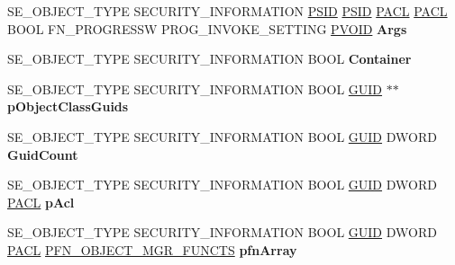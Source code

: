 \begin{DoxyCompactItemize}
\item 
\mbox{\label{struct___n_t_m_a_r_t_a_a40814131d37b427e01cbd51884eb06a3}} 
S\+E\+\_\+\+O\+B\+J\+E\+C\+T\+\_\+\+T\+Y\+PE S\+E\+C\+U\+R\+I\+T\+Y\+\_\+\+I\+N\+F\+O\+R\+M\+A\+T\+I\+ON \hyperlink{struct___s_i_d}{P\+S\+ID} \hyperlink{struct___s_i_d}{P\+S\+ID} \hyperlink{struct___a_c_l}{P\+A\+CL} \hyperlink{struct___a_c_l}{P\+A\+CL} B\+O\+OL F\+N\+\_\+\+P\+R\+O\+G\+R\+E\+S\+SW P\+R\+O\+G\+\_\+\+I\+N\+V\+O\+K\+E\+\_\+\+S\+E\+T\+T\+I\+NG \hyperlink{interfacevoid}{P\+V\+O\+ID} {\bfseries Args}
\item 
\mbox{\label{struct___n_t_m_a_r_t_a_a048477367aba165776025b11d89dbc1b}} 
S\+E\+\_\+\+O\+B\+J\+E\+C\+T\+\_\+\+T\+Y\+PE S\+E\+C\+U\+R\+I\+T\+Y\+\_\+\+I\+N\+F\+O\+R\+M\+A\+T\+I\+ON B\+O\+OL {\bfseries Container}
\item 
\mbox{\label{struct___n_t_m_a_r_t_a_a9179c2e71dad07ca0768cccbfb7040cc}} 
S\+E\+\_\+\+O\+B\+J\+E\+C\+T\+\_\+\+T\+Y\+PE S\+E\+C\+U\+R\+I\+T\+Y\+\_\+\+I\+N\+F\+O\+R\+M\+A\+T\+I\+ON B\+O\+OL \hyperlink{interface_g_u_i_d}{G\+U\+ID} $\ast$$\ast$ {\bfseries p\+Object\+Class\+Guids}
\item 
\mbox{\label{struct___n_t_m_a_r_t_a_a1e26ec4b26f1d5382884581e386419ce}} 
S\+E\+\_\+\+O\+B\+J\+E\+C\+T\+\_\+\+T\+Y\+PE S\+E\+C\+U\+R\+I\+T\+Y\+\_\+\+I\+N\+F\+O\+R\+M\+A\+T\+I\+ON B\+O\+OL \hyperlink{interface_g_u_i_d}{G\+U\+ID} D\+W\+O\+RD {\bfseries Guid\+Count}
\item 
\mbox{\label{struct___n_t_m_a_r_t_a_a8ed5f4402cc4c53641fa3c55f691ef28}} 
S\+E\+\_\+\+O\+B\+J\+E\+C\+T\+\_\+\+T\+Y\+PE S\+E\+C\+U\+R\+I\+T\+Y\+\_\+\+I\+N\+F\+O\+R\+M\+A\+T\+I\+ON B\+O\+OL \hyperlink{interface_g_u_i_d}{G\+U\+ID} D\+W\+O\+RD \hyperlink{struct___a_c_l}{P\+A\+CL} {\bfseries p\+Acl}
\item 
\mbox{\label{struct___n_t_m_a_r_t_a_a003ba4b7af1efcf8f180755b726ae0ed}} 
S\+E\+\_\+\+O\+B\+J\+E\+C\+T\+\_\+\+T\+Y\+PE S\+E\+C\+U\+R\+I\+T\+Y\+\_\+\+I\+N\+F\+O\+R\+M\+A\+T\+I\+ON B\+O\+OL \hyperlink{interface_g_u_i_d}{G\+U\+ID} D\+W\+O\+RD \hyperlink{struct___a_c_l}{P\+A\+CL} \hyperlink{struct___f_n___o_b_j_e_c_t___m_g_r___f_u_n_c_t_i_o_n_s}{P\+F\+N\+\_\+\+O\+B\+J\+E\+C\+T\+\_\+\+M\+G\+R\+\_\+\+F\+U\+N\+C\+TS} {\bfseries pfn\+Array}
$$
\end{DoxyCompactItemize}
